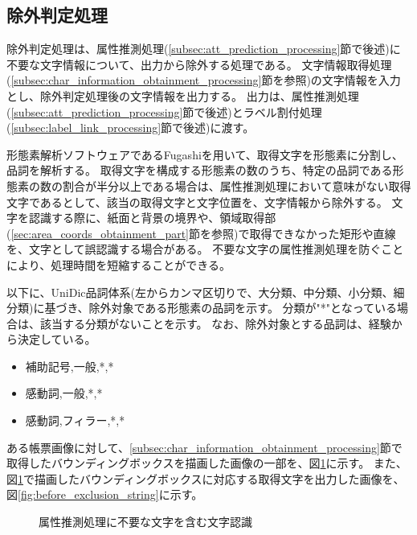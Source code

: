 \subsection{除外判定処理}\label{subsec:exclusion_judgement_processing}
除外判定処理は、属性推測処理(\ref{subsec:att_prediction_processing}節で後述)に不要な文字情報について、出力から除外する処理である。
文字情報取得処理(\ref{subsec:char_information_obtainment_processing}節を参照)の文字情報を入力とし、除外判定処理後の文字情報を出力する。
出力は、属性推測処理(\ref{subsec:att_prediction_processing}節で後述)とラベル割付処理(\ref{subsec:label_link_processing}節で後述)に渡す。

形態素解析ソフトウェアであるFugashiを用いて、取得文字を形態素に分割し、品詞を解析する。
取得文字を構成する形態素の数のうち、特定の品詞である形態素の数の割合が半分以上である場合は、属性推測処理において意味がない取得文字であるとして、該当の取得文字と文字位置を、文字情報から除外する。
文字を認識する際に、紙面と背景の境界や、領域取得部(\ref{sec:area_coords_obtainment_part}節を参照)で取得できなかった矩形や直線を、文字として誤認識する場合がある。
不要な文字の属性推測処理を防ぐことにより、処理時間を短縮することができる。

以下に、UniDic品詞体系(左からカンマ区切りで、大分類、中分類、小分類、細分類)に基づき、除外対象である形態素の品詞を示す。
分類が"*"となっている場合は、該当する分類がないことを示す。
なお、除外対象とする品詞は、経験から決定している。

\begin{itemize}
    \item 補助記号,一般,*,*
    \item 感動詞,一般,*,*
    \item 感動詞,フィラー,*,*
\end{itemize}

ある帳票画像に対して、\ref{subsec:char_information_obtainment_processing}節で取得したバウンディングボックスを描画した画像の一部を、図\ref{fig:before_exclusion_bbox}に示す。
また、図\ref{fig:before_exclusion_bbox}で描画したバウンディングボックスに対応する取得文字を出力した画像を、図\ref{fig:before_exclusion_string}に示す。

\begin{figure}[tp]
    \begin{center}
        \caption{属性推測処理に不要な文字を含む文字認識}
        \label{fig:before_exclusion_bbox}
    \end{center}
\end{figure}

